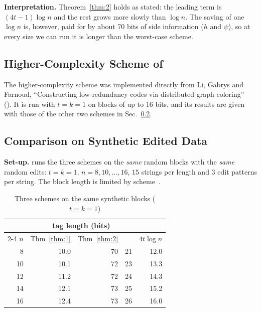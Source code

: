 \documentclass[journal,10pt]{IEEEtran}
\begin{document}
\textbf{Interpretation.} Theorem~\ref{thm:2} holds as stated: the leading term is $(4t-1)\log n$ and the rest grows more slowly than $\log n$. The saving of one $\log n$ is, however, paid for by about 70 bits of side information ($h$ and $\psi$), so at every size we can run it is longer than the worst-case scheme.

\subsection{Higher-Complexity Scheme of~\cite{li21}}\label{sec:li21}
The higher-complexity scheme was implemented directly from Li, Gabrys and Farnoud, ``Constructing low-redundancy codes via distributed graph coloring''~\cite{li21} (). It is run with $t=k=1$ on blocks of up to $16$ bits, and its results are given with those of the other two schemes in Sec.~\ref{sec:compare}.

\subsection{Comparison on Synthetic Edited Data}\label{sec:compare}
\textbf{Set-up.}  runs the three schemes on the \emph{same} random blocks with the \emph{same} random edits: $t=k=1$, $n=8,10,\dots,16$, $15$ strings per length and $3$ edit patterns per string. The block length is limited by scheme~\cite{li21}.

\begin{table}[!t]
\caption{Three schemes on the same synthetic blocks ($t=k=1$)}\label{tab:compare}
\centering\footnotesize
\setlength{\tabcolsep}{3pt}
\begin{tabular}{@{}rrrrr@{}}
\toprule
 & \multicolumn{3}{c}{tag length (bits)} & \\
\cmidrule(lr){2-4}
$n$ & Thm~\ref{thm:1} & Thm~\ref{thm:2} & \cite{li21} & $4t\log n$\\
\midrule
8 & 10.0 & 70 & 21 & 12.0\\
10 & 10.1 & 72 & 23 & 13.3\\
12 & 11.2 & 72 & 24 & 14.3\\
14 & 12.1 & 73 & 25 & 15.2\\
16 & 12.4 & 73 & 26 & 16.0\\
\bottomrule
\end{tabular}
\end{table}
\end{document}
